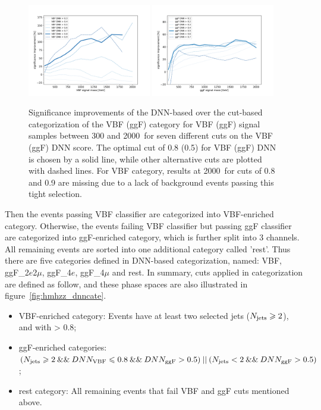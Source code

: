 \begin{figure}[htbp]
        \includegraphics[width=0.48\textwidth]{figures/HMHZZ/selection/VBF_significance_improvement.pdf}
        \includegraphics[width=0.48\textwidth]{figures/HMHZZ/selection/ggf_significance_improvement.pdf}
        \centering
        \caption{Significance improvements of the DNN-based over the cut-based categorization of the VBF (ggF) category for VBF (ggF) signal samples between 300 and 2000~\gev for seven different cuts on the VBF (ggF) DNN score. 
	The optimal cut of 0.8 (0.5) for VBF (ggF) DNN is chosen by a solid line, while other alternative cuts are plotted with dashed lines. 
	For VBF category, results at 2000~\gev for cuts of 0.8 and 0.9 are missing due to a lack of background events passing this tight selection.}
        \label{fig:dnn_significance}
\end{figure}

Then the events passing VBF classifier are categorized into VBF-enriched category.
Otherwise, the events failing VBF classifier but passing ggF classifier are categorized into ggF-enriched category, which is further split into 3 channels.
All remaining events are sorted into one additional category called 'rest'.
Thus there are five categories defined in DNN-based categorization, named: VBF, ggF\_2$e$2$\mu$, ggF\_4$e$, ggF\_4$\mu$ and rest.
In summary, cuts applied in categorization are defined as follow, and these phase spaces are also illustrated in figure~\ref{fig:hmhzz_dnncate}.

\begin{itemize}
	\item VBF-enriched category: Events have at least two selected jets ($N_{\mathrm{jets}}  \geqslant 2$), and with \DNNVBF > 0.8;
	\item ggF-enriched categories: $(N_{\mathrm{jets}}  \geqslant 2 \:\&\&\: DNN_{\mathrm{VBF}} \leqslant 0.8 \:\&\&\: DNN_{\mathrm{ggF}} > 0.5) \:||\: (N_{\mathrm{jets}}  < 2 \:\&\&\: DNN_{\mathrm{ggF}} > 0.5)$; 
	\item rest category: All remaining events that fail VBF and ggF cuts mentioned above.
\end{itemize}

